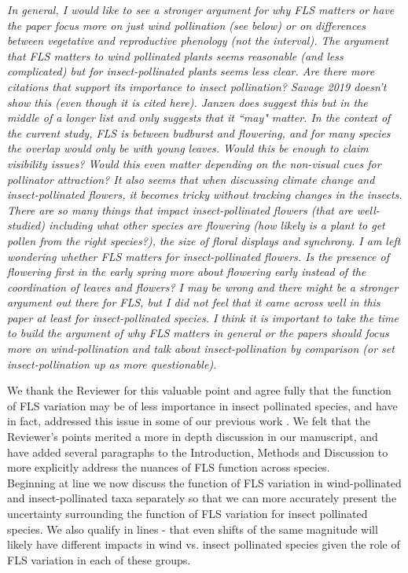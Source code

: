 \documentclass[11pt]{article}
\begin{document}
\emph{In general, I would like to see a stronger argument for why FLS matters or have the paper focus more on just wind pollination (see below) or on differences between vegetative and reproductive phenology (not the interval). The argument that FLS matters to wind pollinated plants seems reasonable (and less complicated) but for insect-pollinated plants seems less clear. Are there more citations that support its importance to insect pollination? Savage 2019 doesn’t show this (even though it is cited here). Janzen does suggest this but in the middle of a longer list and only suggests that it ``may" matter. In the context of the current study, FLS is between budburst and flowering, and for many species the overlap would only be with young leaves. Would this be enough to claim visibility issues? Would this even matter depending on the non-visual cues for pollinator attraction? It also seems that when discussing climate change and insect-pollinated flowers, it becomes tricky without tracking changes in the insects. There are so many things that impact insect-pollinated flowers (that are well-studied) including what other species are flowering (how likely is a plant to get pollen from the right species?), the size of floral displays and synchrony. I am left wondering whether FLS matters for insect-pollinated flowers. Is the presence of flowering first in the early spring more about flowering early instead of the coordination of leaves and flowers?  I may be wrong and there might be a stronger argument out there for FLS, but I did not feel that it came across well in this paper at least for insect-pollinated species. I think it is important to take the time to build the argument of why FLS matters in general or the papers should focus more on wind-pollination and talk about insect-pollination by comparison (or set insect-pollination up as more questionable).}

\noindent We thank the Reviewer for this valuable point and agree fully that the function of FLS variation may be of less importance in insect pollinated species, and have in fact, addressed this issue in some of our previous work \citep{Buonaiuto2020}. We felt that the Reviewer's points merited a more in depth discussion in our manuscript, and have added several paragraphs to the Introduction, Methods and Discussion to more explicitly address the nuances of FLS function across species.\\

\noindent Beginning at line  we now discuss the function of FLS variation in wind-pollinated and insect-pollinated taxa separately so that we can more accurately present the uncertainty surrounding the function of FLS variation for insect pollinated species. We also qualify in lines - that even shifts of the same magnitude will likely have different impacts in wind vs. insect pollinated species given the role of FLS variation in each of these groups.\\
\end{document}
